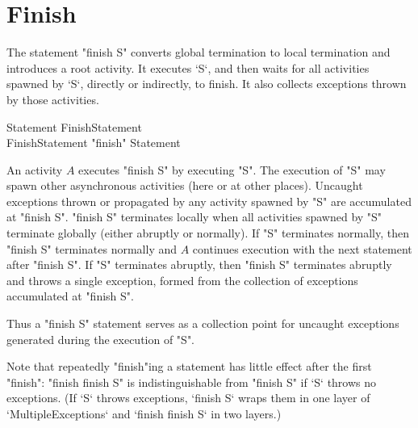 \section{Finish}\label{finish}
The statement \xcd"finish S" converts global termination to local
termination and introduces a root activity.   It executes \xcd`S`, and then
waits for all activities spawned by \xcd`S`, directly or indirectly, to
finish. It also collects exceptions thrown by those activities.

\begin{grammar}
Statement \: FinishStatement \\
FinishStatement \: \xcd"finish" Statement 
\end{grammar}

An activity $A$ executes \xcd"finish S" by executing \xcd"S".  The
execution of \xcd"S" may spawn other asynchronous activities (here or
at other places).  Uncaught exceptions thrown or propagated by any
activity spawned by \xcd"S" are accumulated at \xcd"finish S".
\xcd"finish S" terminates locally when all activities spawned by
\xcd"S" terminate globally (either abruptly or normally). If \xcd"S"
terminates normally, then \xcd"finish S" terminates normally and $A$
continues execution with the next statement after \xcd"finish S".  If
\xcd"S" terminates abruptly, then \xcd"finish S" terminates abruptly
and throws a single exception, 
formed from the collection of exceptions accumulated at \xcd"finish S".

Thus a \xcd"finish S" statement serves as a collection point for
uncaught exceptions generated during the execution of \xcd"S".

Note that repeatedly \xcd"finish"ing a statement has little effect after
the first \xcd"finish": \xcd"finish finish S" is indistinguishable
from \xcd"finish S" if \xcd`S` throws no exceptions.  (If \xcd`S` throws
exceptions, \xcd`finish S` wraps them in one layer of 
\xcd`MultipleExceptions` and \xcd`finish finish S` in two layers.)

